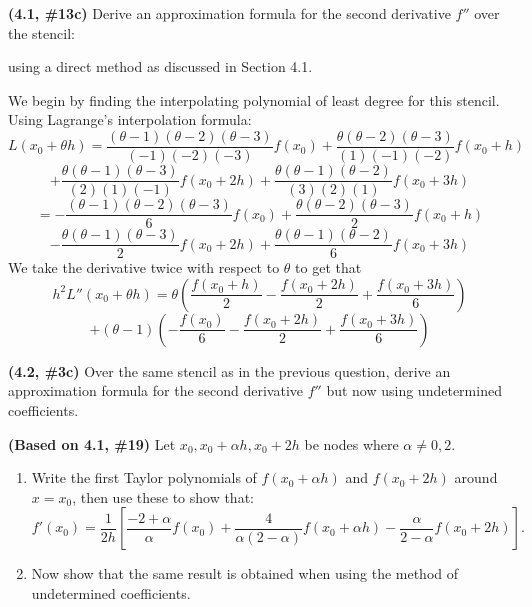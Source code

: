 \documentclass{eh-homework}
\begin{document}
\begin{question}{3}
\textbf{(4.1, \#13c)} Derive an approximation formula for the second derivative \( f'' \) over the stencil:

\begin{center}
\end{center}

using a direct method as discussed in Section 4.1.

\bigskip

We begin by finding the interpolating polynomial of least degree for this stencil. Using Lagrange's interpolation formula:
\[
    L(x_0 + \theta h) = \frac{(\theta - 1)(\theta - 2)(\theta - 3)}{(-1)(-2)(-3)}f(x_0) + \frac{\theta(\theta - 2)(\theta - 3)}{(1)(-1)(-2)}f(x_0 + h)
\]
\[
    + \frac{\theta(\theta - 1)(\theta - 3)}{(2)(1)(-1)}f(x_0 + 2h) + \frac{\theta(\theta - 1)(\theta - 2)}{(3)(2)(1)}f(x_0 + 3h)
\]
\[
    =-\frac{(\theta - 1)(\theta - 2)(\theta - 3)}{6}f(x_0) + \frac{\theta(\theta - 2)(\theta - 3)}{2}f(x_0 + h)
\]
\[
    - \frac{\theta(\theta - 1)(\theta - 3)}{2}f(x_0 + 2h) + \frac{\theta(\theta - 1)(\theta - 2)}{6}f(x_0 + 3h)
\]
We take the derivative twice with respect to \(\theta\) to get that
\[
    h^2L''(x_0 + \theta h) = \theta \left(\frac{f(x_0 + h)}{2} - \frac{f(x_0 + 2h)}{2} + \frac{f(x_0 + 3h)}{6}\right)
\]
\[
    + (\theta - 1)\left( -\frac{f(x_0)}{6} - \frac{f(x_0 + 2h)}{2} + \frac{f(x_0 + 3h)}{6} \right) 
\]
\end{question}

\begin{question}{4}
\textbf{(4.2, \#3c)} Over the same stencil as in the previous question, derive an approximation formula for the second derivative \( f'' \) but now using undetermined coefficients.
\end{question}

\begin{question}{5}
\textbf{(Based on 4.1, \#19)} Let \( x_0, x_0 + \alpha h, x_0 + 2h \) be nodes where \( \alpha \neq 0,2 \).

\begin{enumerate}[label=\alph*.]
    \item Write the first Taylor polynomials of \( f(x_0 +\alpha h) \) and \( f(x_0 +2h) \) around \( x = x_0 \), then use these to show that:
    \[
    f'(x_0) = \frac{1}{2h} \left[ \frac{-2+\alpha}{\alpha} f(x_0) + \frac{4}{\alpha(2-\alpha)} f(x_0 + \alpha h) - \frac{\alpha}{2-\alpha} f(x_0 + 2h) \right].
    \]

    \item Now show that the same result is obtained when using the method of undetermined coefficients.
\end{enumerate}
\end{question}
\end{document}
